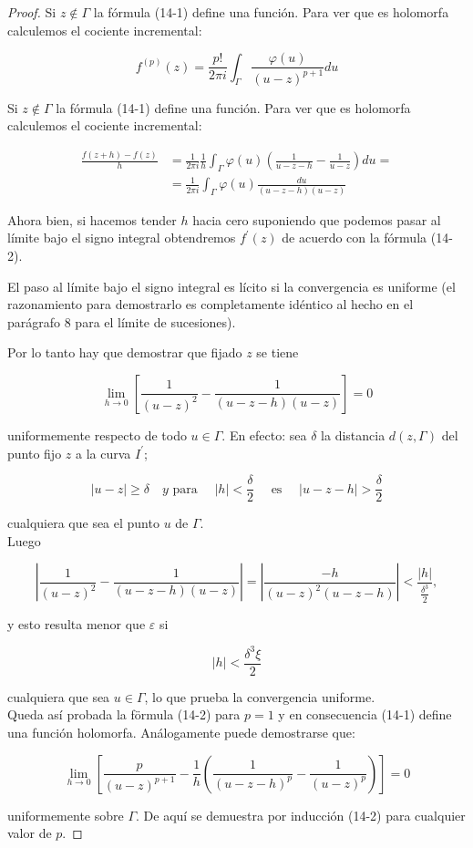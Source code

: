 \documentclass[10pt]{article}
\theoremstyle{plain}
\theoremstyle{definition}
\theoremstyle{remark}
\begin{document}
\begin{proof}
Si $z \notin \Gamma$ la fórmula (14-1) define una función. Para ver que es holomorfa calculemos el cociente incremental:


\begin{equation*}
f^{(p)}(z)=\frac{p!}{2 \pi i} \int_{\Gamma} \frac{\varphi(u)}{(u-z)^{p+1}} d u \tag{14-2}
\end{equation*}


Si $z \notin \Gamma$ la fórmula (14-1) define una función. Para ver que es holomorfa calculemos el cociente incremental:

$$
\begin{aligned}
\frac{f(z+h)-f(z)}{h} & =\frac{1}{2 \pi i} \frac{1}{h} \int_{\Gamma} \varphi(u)\left(\frac{1}{u-z-h}-\frac{1}{u-z}\right) d u= \\
& =\frac{1}{2 \pi i} \int_{\Gamma} \varphi(u) \frac{d u}{(u-z-h)(u-z)}
\end{aligned}
$$

Ahora bien, si hacemos tender $h$ hacia cero suponiendo que podemos pasar al límite bajo el signo integral obtendremos $f^{\prime}(z)$ de acuerdo con la fórmula (14-2).

El paso al límite bajo el signo integral es lícito si la convergencia es uniforme (el razonamiento para demostrarlo es completamente idéntico al hecho en el parágrafo 8 para el límite de sucesiones).

Por lo tanto hay que demostrar que fijado $z$ se tiene

$$
\lim _{h \rightarrow 0}\left[\frac{1}{(u-z)^{2}}-\frac{1}{(u-z-h)(u-z)}\right]=0
$$

uniformemente respecto de todo $u \in \Gamma$. En efecto: sea $\delta$ la distancia $d(z, \Gamma)$ del punto fijo $z$ a la curva $I^{\prime}$;

$$
|u-z| \geqslant \delta \quad y \text { para } \quad|h|<\frac{\delta}{2} \quad \text { es } \quad|u-z-h|>\frac{\delta}{2}
$$

cualquiera que sea el punto $u$ de $\Gamma$.\\
Luego

$$
\left|\frac{1}{(u-z)^{2}}-\frac{1}{(u-z-h)(u-z)}\right|=\left|\frac{-h}{(u-z)^{2}(u-z-h)}\right|<\frac{|h|}{\frac{\delta^{3}}{2}},
$$

y esto resulta menor que $\varepsilon$ si

$$
|h|<\frac{\delta^{3} \xi}{2}
$$

cualquiera que sea $u \in \Gamma$, lo que prueba la convergencia uniforme.\\
Queda así probada la förmula (14-2) para $p=1$ y en consecuencia (14-1) define una función holomorfa. Análogamente puede demostrarse que:

$$
\lim _{h \rightarrow 0}\left[\frac{p}{(u-z)^{p+1}}-\frac{1}{h}\left(\frac{1}{(u-z-h)^{p}}-\frac{1}{(u-z)^{p}}\right)\right]=0
$$

uniformemente sobre $\Gamma$. De aquí se demuestra por inducción (14-2) para cualquier valor de $p$.
\end{proof}
\end{document}
